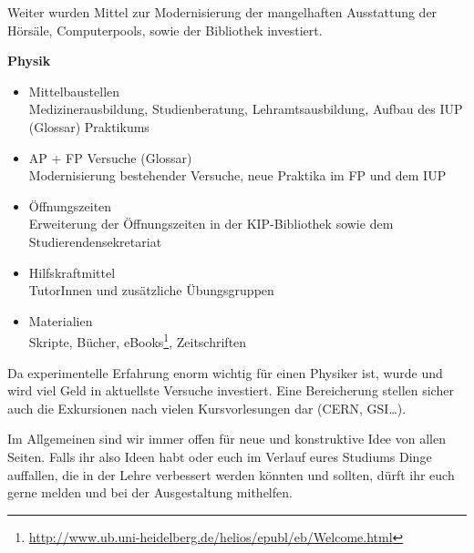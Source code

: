 Weiter wurden Mittel zur Modernisierung der mangelhaften Ausstattung der Hörsäle, Computerpools, sowie der Bibliothek investiert.

\vspace{5mm}
\textbf{Physik}
\begin{itemize}
\item {Mittelbaustellen}\\
	Medizinerausbildung, Studienberatung, Lehramtsausbildung, Aufbau des IUP (Glossar) Praktikums
\item {AP + FP Versuche (Glossar)}\\
	Modernisierung bestehender Versuche, neue Praktika im FP und dem IUP
\item {Öffnungszeiten}\\
	Erweiterung der Öffnungszeiten in der \gls{KIP}-Bibliothek sowie dem Studierendensekretariat
\item {Hilfskraftmittel}\\
	TutorInnen und zusätzliche Übungsgruppen
\item {Materialien}\\
	Skripte, Bücher, eBooks\footnote{\url{http://www.ub.uni-heidelberg.de/helios/epubl/eb/Welcome.html}}, Zeitschriften
\end{itemize}

Da experimentelle Erfahrung enorm wichtig für einen Physiker ist, wurde und wird viel Geld in aktuellste Versuche investiert. Eine Bereicherung stellen sicher auch die Exkursionen nach vielen Kursvorlesungen dar (CERN, GSI\dots).

Im Allgemeinen sind wir immer offen für neue und konstruktive Idee von allen Seiten. Falls ihr also Ideen habt oder euch im Verlauf eures Studiums Dinge auffallen, die in der Lehre verbessert werden könnten und sollten, dürft ihr euch gerne melden und bei der Ausgestaltung mithelfen.
